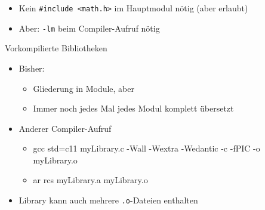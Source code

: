 
\begin{frame}[fragile]
%
%
%
\begin{itemize}
\item Kein \texttt{#include <math.h>} im Hauptmodul nötig (aber erlaubt)
\item Aber: \texttt{-lm} beim Compiler-Aufruf nötig
\end{itemize}
%
\end{frame}


\begin{frame}{Vorkompilierte Bibliotheken}
%
\begin{itemize}
\item Bisher:
	\begin{itemize}
	\item Gliederung in Module, aber
	\item Immer noch jedes Mal jedes Modul komplett übersetzt
	\end{itemize}
\item Anderer Compiler-Aufruf
	\begin{itemize}
	\item 
\begin{cmdbox}
\scriptsize
gcc std=c11 myLibrary.c -Wall -Wextra -Wedantic {\color{cyan} -c -fPIC} -o myLibrary.o
\end{cmdbox}
	\item 
\begin{cmdbox}
\scriptsize
ar rcs myLibrary.a myLibrary.o
\end{cmdbox}
	\end{itemize}
\item Library kann auch mehrere \texttt{.o}-Dateien enthalten
\end{itemize}
%
\end{frame}

